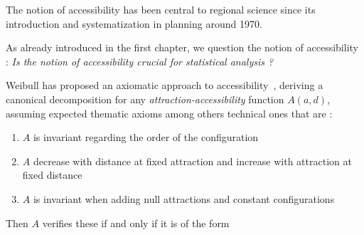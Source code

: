 
The notion of accessibility has been central to regional science since its introduction and systematization in planning around 1970. 





As already introduced in the first chapter, we question the notion of accessibility : \textit{Is the notion of accessibility crucial for statistical analysis ?}

\medskip


Weibull has proposed an axiomatic approach to accessibility~\cite{weibull1976axiomatic}, deriving a canonical decomposition for any \emph{attraction-accessibility} function $A(a,d)$, assuming expected thematic axioms among others technical ones that are :
\begin{enumerate}
\item $A$ is invariant regarding the order of the configuration
\item $A$ decrease with distance at fixed attraction and increase with attraction at fixed distance
\item $A$ is invariant when adding null attractions and constant configurations
\end{enumerate}
Then $A$ verifies these if and only if it is of the form

